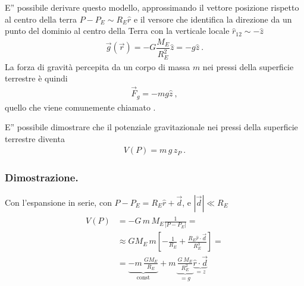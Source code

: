 \documentclass[letterpaper,10pt,italian]{jupyterBook}
\begin{document}
\sphinxAtStartPar
E” possibile derivare questo modello, approssimando il vettore posizione rispetto al centro della terra \(P - P_E \sim R_E \hat{r}\) e il versore che identifica la direzione da un punto del dominio al centro della Terra con la verticale locale \(\hat{r}_{12} \sim - \hat{z}\)
\begin{equation*}
\begin{split}\vec{g}(\vec{r}) = - G \dfrac{M_E}{R_E^2} \hat{z} = - g \hat{z} \ .\end{split}
\end{equation*}
\sphinxAtStartPar
La forza di gravità percepita da un corpo di massa \(m\) nei pressi della superficie terrestre è quindi
\begin{equation*}
\begin{split}\vec{F}_g = - m g \hat{z} \ ,\end{split}
\end{equation*}
\sphinxAtStartPar
quello che viene comunemente chiamato .

\sphinxAtStartPar
{} E” possibile dimostrare che il potenziale gravitazionale nei pressi della superficie terrestre diventa
\begin{equation*}
\begin{split}V(P) = m \, g \, z_P \ .\end{split}
\end{equation*}\subsubsection*{Dimostrazione.}

\sphinxAtStartPar
Con l’espansione in serie, con \(P - P_E = R_E \hat{r} + \vec{d}\), e \(|\vec{d}| \ll R_E\)
\begin{equation*}
\begin{split}\begin{aligned}
  V(P) & = - G \, m \, M_E \frac{1}{|P - P_E|} = \\
       & \approx G M_E \, m \left[ - \frac{1}{R_E} + \frac{R_E \hat{r} \cdot \vec{d}}{R_E^3}  \right]   = \\
       & = \underbrace{- m \, \frac{ G M_E}{R_E}}_{\text{const}} + m \, \underbrace{\frac{G \, M_E}{R_E^2}}_{= g} \underbrace{\hat{r} \cdot \vec{d}}_{= z}
\end{aligned}\end{split}
\end{equation*}
\end{document}
